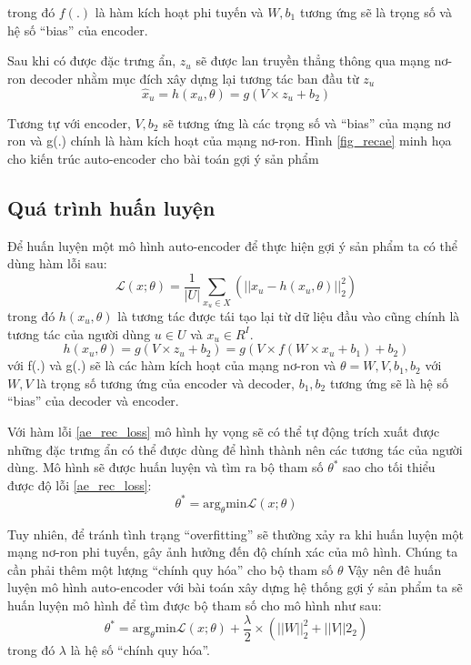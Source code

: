   
    trong đó $f(.)$ là hàm kích hoạt phi tuyến và $W,b_1$ tương ứng sẽ là trọng số và hệ số ``bias'' của encoder. 

    Sau khi có được đặc trưng ẩn, $z_u$ sẽ được lan truyền thẳng thông qua mạng nơ-ron decoder nhằm mục đích xây dựng lại tương tác ban đầu từ $z_u$
    \begin{equation}
        \widehat{x}_u = h(x_u,\theta) = g(V \times z_u + b_2)
    \end{equation}

    Tương tự với encoder, $V,b_2$ sẽ tương ứng là các trọng số và ``bias'' của mạng nơ ron và g(.) chính là hàm kích hoạt của mạng nơ-ron.
    Hình \ref{fig_recae} minh họa cho kiến trúc auto-encoder cho bài toán gợi ý sản phẩm

    \subsection{Quá trình huấn luyện}
    
    Để huấn luyện một mô hình auto-encoder để thực hiện gợi ý sản phẩm ta có thể dùng hàm lỗi sau:
    \begin{equation}
        \label{ae_rec_loss}
        \mathcal{L}(x;\theta) = \frac {1}{|U|}\sum_{x_u \in X}(||x_u - h(x_u,\theta)||^2_2)
    \end{equation}
    trong đó $h(x_u,\theta)$ là tương tác được tái tạo lại từ dữ liệu đầu vào cũng chính là tương tác của người dùng $u \in U$ và $x_u \in R^I$.
    \begin{equation}
        h(x_u,\theta) = g(V \times z_u + b_2) = g(V \times f(W \times x_u + b_1) + b_2)
    \end{equation}    
    với f(.) và g(.) sẽ là các hàm kích hoạt của mạng nơ-ron và $\theta = {W, V, b_1, b_2}$ với $W,V$ là trọng số tương ứng của encoder và decoder, $b_1,b_2$ tương ứng sẽ là hệ số ``bias'' của decoder và encoder.
    
    Với hàm lỗi \ref{ae_rec_loss} mô hình hy vọng sẽ có thể tự động trích xuất được những đặc trưng ẩn có thể được dùng để hình thành nên các tương tác của người dùng.
    Mô hình sẽ được huấn luyện và tìm ra bộ tham số $\theta^*$ sao cho tối thiểu được độ lỗi \ref{ae_rec_loss}: 
    \begin{equation}
        \theta^* = \text{arg}_\theta \text{min}  \mathcal{L}(x;\theta)
    \end{equation}    
    

    Tuy nhiên, để tránh tình trạng ``overfitting'' sẽ thường xảy ra khi huấn luyện một mạng nơ-ron phi tuyến, gây ảnh hưởng đến độ chính xác của mô hình. 
    Chúng ta cần phải thêm một lượng ``chính quy hóa'' cho bộ tham số $\theta$   
    Vậy nên đê huấn luyện mô hình auto-encoder với bài toán xây dựng hệ thống gợi ý sản phẩm ta sẽ huấn luyện mô hình để tìm được bộ tham số cho mô hình  như sau:
    \begin{equation}
        \label{ae_rec_obj}
        \theta^* = \text{arg}_\theta \text{min}  \mathcal{L}(x;\theta)  + \frac \lambda 2 \times (||W||^2_2 + ||V||2_2)
    \end{equation}
    trong đó $\lambda$ là hệ số ``chính quy hóa''.

